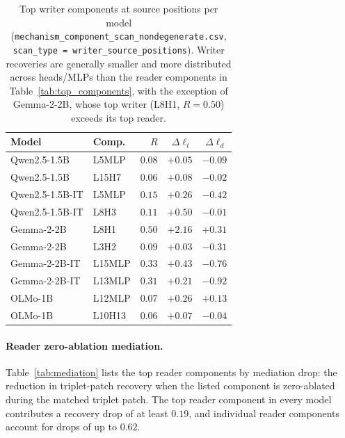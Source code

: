 \documentclass[11pt]{article}
\begin{document}
\begin{table}[H]
\centering
\footnotesize
\begin{tabular*}{\columnwidth}{@{\extracolsep{\fill}}llrrr@{}}
\toprule
Model & Comp. & $R$ & $\Delta\ell_t$ & $\Delta\ell_d$ \\
\midrule
Qwen2.5-1.5B    & L5MLP  & $0.08$ & $+0.05$ & $-0.09$ \\
Qwen2.5-1.5B    & L15H7  & $0.06$ & $+0.08$ & $-0.02$ \\
Qwen2.5-1.5B-IT & L5MLP  & $0.15$ & $+0.26$ & $-0.42$ \\
Qwen2.5-1.5B-IT & L8H3   & $0.11$ & $+0.50$ & $-0.01$ \\
Gemma-2-2B      & L8H1   & $0.50$ & $+2.16$ & $+0.31$ \\
Gemma-2-2B      & L3H2   & $0.09$ & $+0.03$ & $-0.31$ \\
Gemma-2-2B-IT   & L15MLP & $0.33$ & $+0.43$ & $-0.76$ \\
Gemma-2-2B-IT   & L13MLP & $0.31$ & $+0.21$ & $-0.92$ \\
OLMo-1B         & L12MLP & $0.07$ & $+0.26$ & $+0.13$ \\
OLMo-1B         & L10H13 & $0.06$ & $+0.07$ & $-0.04$ \\
\bottomrule
\end{tabular*}
\caption{Top writer components at source positions per model
(\texttt{mechanism\_component\_scan\_\allowbreak nondegenerate.csv}, \texttt{scan\_type =
writer\_source\_positions}). Writer recoveries are generally smaller and more distributed
across heads/MLPs than the reader components in Table~\ref{tab:top_components}, with the
exception of Gemma-2-2B, whose top writer (L8H1, $R{=}0.50$) exceeds its top reader.}
\label{tab:top_writers}
\end{table}

\paragraph{Reader zero-ablation mediation.}
Table~\ref{tab:mediation} lists the top reader components by mediation drop: the reduction in
triplet-patch recovery when the listed component is zero-ablated during the matched triplet
patch. The top reader component in every model contributes a recovery drop of at least
$0.19$, and individual reader components account for drops of up to $0.62$.
\end{document}

